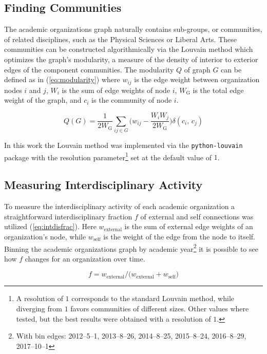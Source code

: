 \documentclass[notitlepage,aps,prd,nofootinbib]{revtex4-1}
\begin{document}
\subsection{Finding Communities}
The academic organizations graph naturally contains sub-groups, or communities, of related disciplines, such as the Physical Sciences or Liberal Arts. These communities can be constructed algorithmically via the Louvain method \cite{louvain} which optimizes the graph's modularity, a measure of the density of interior to exterior edges of the component communities. The modularity $Q$ of graph $G$ can be defined as in (\ref{eq:modularity}) where $w_{ij}$ is the edge weight between organization nodes $i$ and $j$, $W_{i}$ is the sum of edge weights of node $i$, $W_{\mathrm{G}}$ is the total edge weight of the graph, and $c_{i}$ is the community of node $i$.

\begin{equation} \label{eq:modularity}
Q\left(G\right) = \frac{1}{2 W_{\mathrm{G}}} \sum_{ij \in G} \bigg(w_{ij} - \frac{W_{i} W_{j}}{2 W_{\mathrm{G}}}\bigg) \delta\left(c_{i},\,c_{j}\right)
\end{equation}

In this work the Louvain method was implemented via the \texttt{python-louvain} package \cite{python-louvain} with the resolution parameter\footnote{A resolution of $1$ corresponds to the standard Louvain method, while diverging from $1$ favors communities of different sizes. Other values where tested, but the best results were obtained with a resolution of $1$.} set at the default value of $1$.


\subsection{Measuring Interdisciplinary Activity}
To measure the interdisciplinary activity of each academic organization a straightforward interdisciplinary fraction $f$ of external and self connections was utilized (\ref{eq:intdisfrac}). Here $w_{\text{external}}$ is the sum of external edge weights of an organization's node, while $w_{\text{self}}$ is the weight of the edge from the node to itself. Binning the academic organizations graph by academic year\footnote{With bin edges: 2012--5--1, 2013--8--26, 2014--8--25, 2015--8--24, 2016--8--29, 2017--10--1} it is possible to see how $f$ changes for an organization over time.

\begin{equation} \label{eq:intdisfrac}
f = w_{\text{external}} / \big(w_{\text{external}} + w_{\text{self}}\big)
\end{equation}
\end{document}

